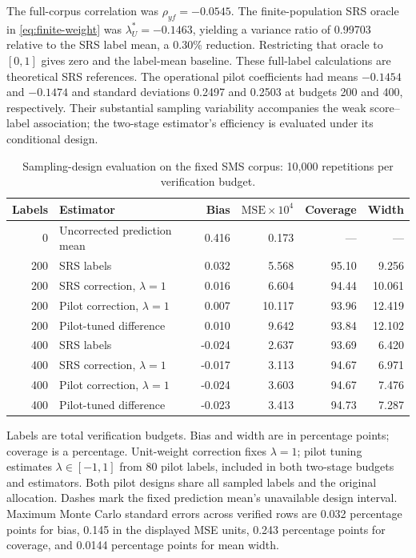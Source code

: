 \documentclass[11pt,a4paper]{article}
\begin{document}
The full-corpus correlation was $\rho_{yf}=-0.0545$. The finite-population SRS oracle in \eqref{eq:finite-weight} was $\lambda_U^*=-0.1463$, yielding a variance ratio of 0.99703 relative to the SRS label mean, a 0.30\% reduction. Restricting that oracle to $[0,1]$ gives zero and the label-mean baseline. These full-label calculations are theoretical SRS references. The operational pilot coefficients had means $-0.1454$ and $-0.1474$ and standard deviations 0.2497 and 0.2503 at budgets 200 and 400, respectively. Their substantial sampling variability accompanies the weak score--label association; the two-stage estimator's efficiency is evaluated under its conditional design.

\begin{table}[!htbp]
\centering\small
\caption{Sampling-design evaluation on the fixed SMS corpus: 10,000 repetitions per verification budget.}\label{tab:sms}
\begin{tabularx}{\textwidth}{@{}rYrrrr@{}}
\toprule
Labels & Estimator & Bias & $\mathrm{MSE}\!\times\!10^4$ & Coverage & Width \\
 & Uncorrected prediction mean & 0.416 & 0.173 & --- & --- \\
200 & SRS labels & 0.032 & 5.568 & 95.10 & 9.256 \\
200 & SRS correction, $\lambda=1$ & 0.016 & 6.604 & 94.44 & 10.061 \\
200 & Pilot correction, $\lambda=1$ & 0.007 & 10.117 & 93.96 & 12.419 \\
200 & Pilot-tuned difference & 0.010 & 9.642 & 93.84 & 12.102 \\
400 & SRS labels & -0.024 & 2.637 & 93.69 & 6.420 \\
400 & SRS correction, $\lambda=1$ & -0.017 & 3.113 & 94.67 & 6.971 \\
400 & Pilot correction, $\lambda=1$ & -0.024 & 3.603 & 94.67 & 7.476 \\
400 & Pilot-tuned difference & -0.023 & 3.413 & 94.73 & 7.287 \\
\bottomrule
\end{tabularx}
\vspace{0.3em}
\parbox{\textwidth}{\footnotesize Labels are total verification budgets. Bias and width are in percentage points; coverage is a percentage. Unit-weight correction fixes $\lambda=1$; pilot tuning estimates $\lambda\in[-1,1]$ from 80 pilot labels, included in both two-stage budgets and estimators. Both pilot designs share all sampled labels and the original allocation. Dashes mark the fixed prediction mean's unavailable design interval. Maximum Monte Carlo standard errors across verified rows are 0.032 percentage points for bias, 0.145 in the displayed MSE units, 0.243 percentage points for coverage, and 0.0144 percentage points for mean width.}
\end{table}
\end{document}
